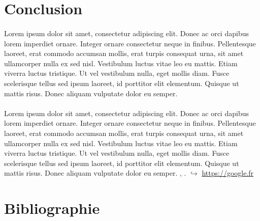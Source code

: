 \section{Conclusion}

\paragraph{}
Lorem ipsum dolor sit amet, consectetur adipiscing elit. Donec ac orci dapibus lorem imperdiet ornare. Integer ornare consectetur neque in finibus. Pellentesque laoreet, erat commodo accumsan mollis, erat turpis consequat urna, sit amet ullamcorper nulla ex sed nisl. Vestibulum luctus vitae leo eu mattis. Etiam viverra luctus tristique. Ut vel vestibulum nulla, eget mollis diam. Fusce scelerisque tellus sed ipsum laoreet, id porttitor elit elementum. Quisque ut mattis risus. Donec aliquam vulputate dolor eu semper. 
\paragraph{}
Lorem ipsum dolor sit amet, consectetur adipiscing elit. Donec ac orci dapibus lorem imperdiet ornare. Integer ornare consectetur neque in finibus. Pellentesque laoreet, erat commodo accumsan mollis, erat turpis consequat urna, sit amet ullamcorper nulla ex sed nisl. Vestibulum luctus vitae leo eu mattis. Etiam viverra luctus tristique. Ut vel vestibulum nulla, eget mollis diam. Fusce scelerisque tellus sed ipsum laoreet, id porttitor elit elementum. Quisque ut mattis risus. Donec aliquam vulputate dolor eu semper. \cite{dbscan-ref}, \cite{dbscan-sklearn-ref}.
$\hookrightarrow$ \url{https://google.fr}\\

\clearpage

\section{Bibliographie}

